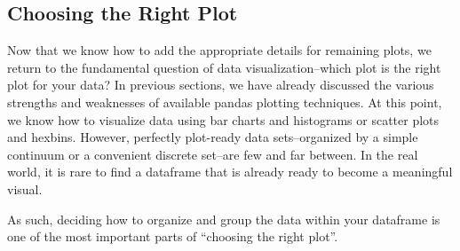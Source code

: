\subsection*{Choosing the Right Plot}
Now that we know how to add the appropriate details for remaining plots, we return to the fundamental question of data visualization--which plot is the right plot for your data? 
In previous sections, we have already discussed the various strengths and weaknesses of available pandas plotting techniques.
At this point, we know how to visualize data using bar charts and histograms or scatter plots and hexbins. 
However, perfectly plot-ready data sets--organized by a simple continuum or a convenient discrete set--are few and far between.
In the real world, it is rare to find a dataframe that is already ready to become a meaningful visual.

As such, deciding how to organize and group the data within your dataframe is one of the most important parts of ``choosing the right plot''.

